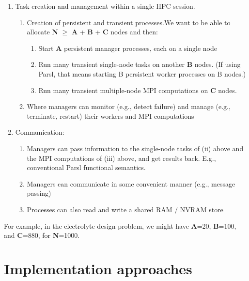 \documentclass[10pt]{article}
\begin{document}
\begin{enumerate}
\item
Task creation and management within a single HPC session.
\begin{enumerate}
\item Creation of persistent and transient processes.We want to be able to allocate \textbf{N} $\ge$  \textbf{A} +  \textbf{B} +  \textbf{C} nodes and then:
\begin{enumerate}
\item
Start  \textbf{A} persistent manager processes, each on a single node
\item
Run many transient single-node tasks on another \textbf{B} nodes. (If using Parsl, that means starting B persistent worker processes on B nodes.)
\item
Run many transient multiple-node MPI computations on \textbf{C} nodes.
\end{enumerate}
\item
Where managers can monitor (e.g., detect failure) and manage (e.g., terminate, restart) their workers and MPI computations
\end{enumerate}
\item
Communication:
\begin{enumerate}
\item
Managers can pass information to the single-node tasks of (ii) above and the MPI computations of (iii) above, and get results back. E.g., conventional Parsl functional semantics.
\item
Managers can communicate in some convenient manner (e.g., message passing)
\item
Processes can also read and write a shared RAM / NVRAM store
\end{enumerate}
\end{enumerate}

For example, in the electrolyte design problem, we might have \textbf{A}=20, \textbf{B}=100, and \textbf{C}=880, for \textbf{N}=1000.


\section{Implementation approaches}
\end{document}
